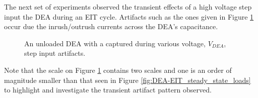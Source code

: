 The next set of experiments observed the transient effects of a high voltage step input the DEA during an EIT cycle. Artifacts such as the ones given in Figure \ref{fig:DEA-EIT_transients} occur due the inrush/outrush currents across the DEA's capacitance. 
\begin{figure}[H]
	\centering
	\hspace{0.2cm}
	\vspace{0.3cm}
	\caption{An unloaded DEA with a captured during various voltage, $V_{DEA}$, step input artifacts.}
	\label{fig:DEA-EIT_transients}
\end{figure}
Note that the scale on Figure \ref{fig:DEA-EIT_transients} contains two scales and one is an order of magnitude smaller than that seen in Figure \ref{fig:DEA-EIT_steady_state_loads} to highlight and investigate the transient artifact pattern observed.

